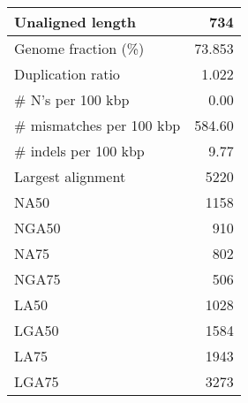\documentclass[12pt,a4paper]{article}
\begin{document}
\begin{table}[ht]
\begin{center}
\begin{tabular}{|l*{1}{|r}|}
Unaligned length & 734 \\ \hline
Genome fraction (\%) & 73.853 \\ \hline
Duplication ratio & 1.022 \\ \hline
\# N's per 100 kbp & 0.00 \\ \hline
\# mismatches per 100 kbp & 584.60 \\ \hline
\# indels per 100 kbp & 9.77 \\ \hline
Largest alignment & 5220 \\ \hline
NA50 & 1158 \\ \hline
NGA50 & 910 \\ \hline
NA75 & 802 \\ \hline
NGA75 & 506 \\ \hline
LA50 & 1028 \\ \hline
LGA50 & 1584 \\ \hline
LA75 & 1943 \\ \hline
LGA75 & 3273 \\ \hline
\end{tabular}
\end{center}
\end{table}
\end{document}
